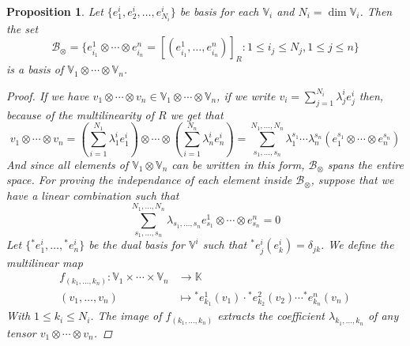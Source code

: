 \documentclass[11pt,a4paper,openright,oneside]{book}
\numberwithin{equation}{section}
\newtheorem{prop0}[defn0]{Proposition}
\newenvironment{proposition}{\bigskip \begin{prop0}}{\end{prop0}}
\begin{document}
\begin{proposition} Let $\{e_1^i, e_2^i, \dots, e_{N_i}^i\}$ be basis for each $\mathbb{V}_i$ and $N_i = \dim \mathbb{V}_i$. Then the set
$$\mathcal{B}_{\otimes} = \{e_{i_1}^1 \otimes \cdots \otimes e_{i_n}^n = [(e_{i_1}^1, \dots, e_{i_n}^n)]_R : 1 \leqslant i_j \leqslant N_j, 1 \leqslant j \leqslant n\}$$
is a basis of $\mathbb{V}_1 \otimes \cdots \otimes \mathbb{V}_n$.
\begin{proof}
If we have $v_1 \otimes \cdots \otimes v_n \in \mathbb{V}_1 \otimes \cdots \otimes \mathbb{V}_n$, if we write
$v_i = \displaystyle\sum_{j=1}^{N_i} \lambda_j^i e_j^i$ then, because of the multilinearity of $R$ we get that
$$v_1 \otimes \cdots \otimes v_n = \left(\sum_{i=1}^{N_1} \lambda_1^i e_1^i \right) \otimes \cdots \otimes 
\left( \sum_{i=1}^{N_n} \lambda_n^i e_n^i \right) = \sum_{s_1, \dots, s_n}^{N_1, \dots, N_n} \lambda_{1}^{s_1} \cdots \lambda_n^{s_n} (e_1^{s_1} \otimes \cdots \otimes e_n^{s_n})$$
And since all elements of $\mathbb{V}_1 \otimes \mathbb{V}_n$ can be written in this form, $\mathcal{B}_\otimes$ spans the entire space. For proving
the independance of each element inside $\mathcal{B}_\otimes$, suppose that we have a linear combination such that
\begin{equation}
\sum_{s_1, \dots, s_n}^{N_1, \dots, N_n} \lambda_{s_1, \dots, s_n} e_{s_1}^1 \otimes \cdots \otimes e_{s_n}^n = 0
\label{eq:base_rep}
\end{equation}
Let $\{\phantom{}^* e_1^i, \dots, \phantom{}^* e_n^i \}$ be the dual basis for $\mathbb{V}^i$ such that $\phantom{}^* e_j^i (e_k^i) = \delta_{jk}$. We define the multilinear map
$$\begin{align}
    f_{(k_1, \dots, k_n)}: \mathbb{V}_1 \times \cdots \times \mathbb{V}_n & \longrightarrow \mathbb{K} \\
    (v_1, \dots, v_n) & \longmapsto \phantom{}^* e_{k_1}^1 (v_1) \cdot \phantom{}^* e_{k_2}^2 (v_2) \cdots \phantom{}^* e_{k_n}^n (v_n)
\end{align}$$
With $1 \leqslant k_i \leqslant N_i$. The image of $f_{(k_1, \dots, k_n)}$ extracts the coefficient $\lambda_{k_1, \dots, k_n}$ of any tensor $v_1 \otimes \cdots \otimes v_n$.


\end{proof}
\end{proposition}
\end{document}
